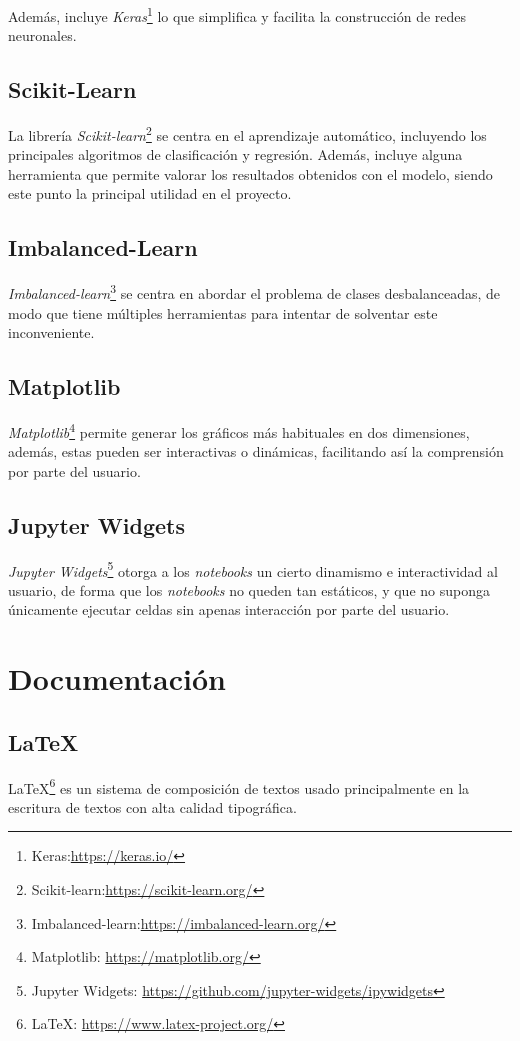 Además, incluye \emph{Keras}\footnote{Keras:\url{https://keras.io/}} lo que simplifica y facilita la construcción de redes neuronales.

\subsection{Scikit-Learn}
La librería \emph{Scikit-learn}\footnote{Scikit-learn:\url{https://scikit-learn.org/}} se centra en el aprendizaje automático, incluyendo los principales algoritmos de clasificación y regresión. Además, incluye alguna herramienta que permite valorar los resultados obtenidos con el modelo, siendo este punto la principal utilidad en el proyecto.

\subsection{Imbalanced-Learn}
\emph{Imbalanced-learn}\footnote{Imbalanced-learn:\url{https://imbalanced-learn.org/}} se centra en abordar el problema de clases desbalanceadas, de modo que tiene múltiples herramientas para intentar de solventar este inconveniente.

\subsection{Matplotlib}
\emph{Matplotlib}\footnote{Matplotlib: \url{https://matplotlib.org/}} permite generar los gráficos más habituales en dos dimensiones, además, estas pueden ser interactivas o dinámicas, facilitando así la comprensión por parte del usuario.

\subsection{Jupyter Widgets}
\emph{Jupyter Widgets}\footnote{Jupyter Widgets: \url{https://github.com/jupyter-widgets/ipywidgets}} otorga a los \emph{notebooks} un cierto dinamismo e interactividad al usuario, de forma que los \emph{notebooks} no queden tan estáticos, y que no suponga únicamente ejecutar celdas sin apenas interacción por parte del usuario.

\section{Documentación}
\subsection{\LaTeX}
\LaTeX\footnote{\LaTeX: \url{https://www.latex-project.org/}} es un sistema de composición de textos usado principalmente en la escritura de textos con alta calidad tipográfica. 

